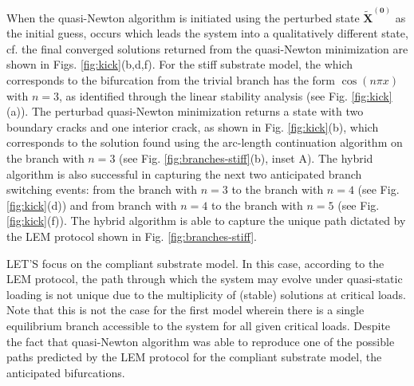When the quasi-Newton algorithm is initiated using the perturbed state \(\mathbf{\tilde X^{(0)}}\)
as the initial guess,  occurs which leads the system into a qualitatively different state, cf. the final  converged solutions returned from the quasi-Newton minimization are shown in Figs. \ref{fig:kick}(b,d,f). For the stiff substrate model, the  which corresponds to the bifurcation from the trivial branch has the form \(\cos(n\pi x)\) with \(n=3\), as identified through the linear stability analysis (see Fig. \ref{fig:kick}(a)). 
The perturbad quasi-Newton minimization returns a state with two boundary cracks and one interior crack, as shown in Fig. \ref{fig:kick}(b), which corresponds to the solution found using the arc-length continuation algorithm on the branch with \(n=3\) (see Fig. \ref{fig:branches-stiff}(b), inset A).  The hybrid algorithm is also successful in capturing the next two anticipated branch   switching events: from the  branch with \(n=3\)  to the branch  with \(n=4\) (see Fig. \ref{fig:kick}(d)) and  from branch with \(n=4\)  to the branch  with \(n=5\) (see Fig. \ref{fig:kick}(f)). The hybrid algorithm is able to capture the unique path dictated by the LEM protocol shown in Fig. \ref{fig:branches-stiff}.   

LET'S focus on the compliant substrate model. In this case, according to the LEM protocol, the path through which the system may evolve under quasi-static loading is not unique due to the multiplicity of (stable) solutions at critical loads.
Note that this is not the case for the first model wherein there is a single equilibrium branch accessible to the system for all given critical loads.
Despite the fact that quasi-Newton algorithm was able to reproduce one of the possible paths predicted by the LEM protocol for the compliant substrate model, the   anticipated bifurcations. 


